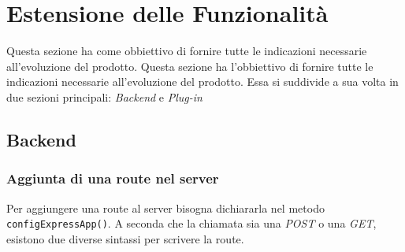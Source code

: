 \section{Estensione delle Funzionalità}\label{Estensione}
Questa sezione ha come obbiettivo di fornire tutte le indicazioni necessarie all'evoluzione del prodotto. 
Questa sezione ha l'obbiettivo di fornire tutte le indicazioni necessarie all'evoluzione del prodotto. 
Essa si suddivide a sua volta in due sezioni principali: \textit{Backend} e \textit{Plug-in}

\subsection{Backend}
\subsubsection{Aggiunta di una route nel server}
Per aggiungere una route al server bisogna dichiararla nel metodo \texttt{configExpressApp()}. 
A seconda che la chiamata sia una \textit{POST} o una \textit{GET}, esistono due diverse sintassi per scrivere la route.
